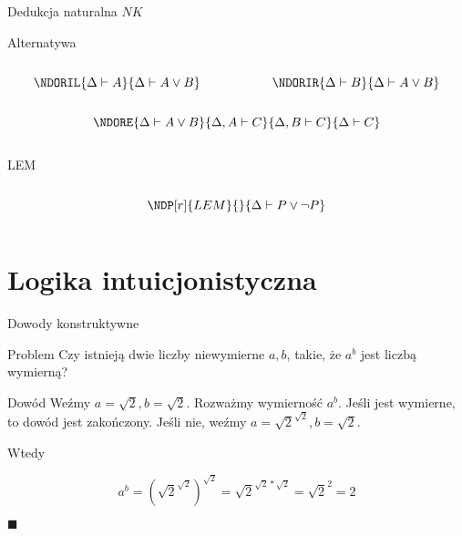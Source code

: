 \documentclass{beamer}
\begin{document}
\begin{frame}{Dedukcja naturalna $NK$}
  \begin{block}{Alternatywa}
    \begin{columns}
      \begin{column}{0.5\textwidth}
        $$
        \NDORIL
          {\Delta \vdash A}
          {\Delta \vdash A \lor B}
        $$
      \end{column}

      \begin{column}{0.5\textwidth}
        $$
        \NDORIR
          {\Delta \vdash B}
          {\Delta \vdash A \lor B}
        $$
      \end{column}
    \end{columns}

    \begin{columns}
      \begin{column}{1\textwidth}
        $$
        \NDORE {\Delta \vdash A \lor B} {\Delta, A \vdash C} {\Delta, B \vdash C}
          {\Delta \vdash C}
        $$
      \end{column}

    \end{columns}
  \end{block}

  \pause

  \begin{alertblock}{LEM}
    \begin{columns}
      \begin{column}{1\textwidth}
        $$
        \NDP[r]{LEM}
          {}
          {\Delta \vdash P \lor \neg P}
        $$
      \end{column}
    \end{columns}
  \end{alertblock}
\end{frame}

\section{Logika intuicjonistyczna}
\begin{frame}{Dowody konstruktywne}
  \begin{block}{Problem}
  Czy istnieją dwie liczby niewymierne $a, b$, takie, że $a^b$ jest liczbą wymierną?
  \end{block}
  
  \pause
  
  \begin{block}{Dowód}
  Weźmy $a=\sqrt{2}, b=\sqrt{2}$. Rozważmy wymierność $a^{b}$. Jeśli jest wymierne, to dowód jest zakończony. Jeśli nie, weźmy $a=\sqrt{2}^{\sqrt{2}}, b=\sqrt{2}$.
  
  Wtedy
  
  $$ a^b = {\left( \sqrt{2}^{\sqrt{2}} \right)}^{\sqrt{2}}
  = \sqrt{2}^{\sqrt{2} \ast \sqrt{2}} = \sqrt{2}^2 = 2
  $$
  
  $\blacksquare$
  
  \end{block}
\end{frame}
\end{document}
